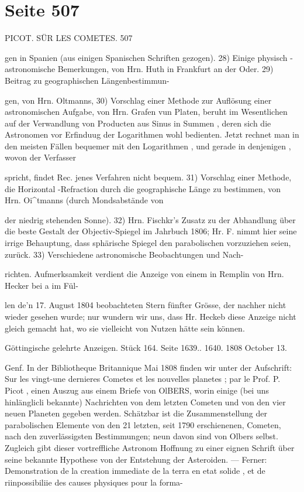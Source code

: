 \documentclass[10pt,a4paper]{article}
\begin{document}
\newpage
\section*{Seite 507}
PICOT. SÜR LES COMETES. 507

gen in Spanien (aus einigen Spanischen Schriften gezogen). 28) Einige physisch - astronomische Bemerkungen, von Hrn. Huth in Frankfurt an der Oder. 29) Beitrag zu geographischen Längenbestimmun-

gen, von Hrn. Oltmanns, 30) Vorschlag einer Methode zur Auflösung einer astronomischen Aufgabe, von Hrn. Grafen vun Platen, beruht im Wesentlichen auf der Verwandlung von Producten aus Sinus in Summen , deren sich die Astronomen vor Erfinduug der Logarithmen wohl bedienten. Jetzt rechnet man in den meisten Fällen bequemer mit den Logarithmen , und gerade in denjenigen , wovon der Verfasser

spricht, findet Rec. jenes Verfahren nicht bequem. 31) Vorschlag einer Methode, die Horizontal -Refraction durch die geographische Länge zu bestimmen, von Hrn. Oi\textasciicircum{}tmanns (durch Mondsabstände von

der niedrig stehenden Sonne). 32) Hrn. Fischkr's Zusatz zu der Abhandlung über die beste Gestalt der Objectiv-Spiegel im Jahrbuch 1806; Hr. F. nimmt hier seine irrige Behauptung, dass sphärische Spiegel den parabolischen vorzuziehen seien, zurück. 33) Verschiedene astronomische Beobachtungen und Nach-

richten. Aufmerksamkeit verdient die Anzeige von einem in Remplin von Hrn. Hecker bei a im Fül-

len de'n 17. August 1804 beobachteten Stern fünfter Grösse, der nachher nicht wieder gesehen wurde; nur wundern wir uns, dass Hr. Heckeb diese Anzeige nicht gleich gemacht hat, wo sie vielleicht von Nutzen hätte sein können.

Göttingische gelehrte Anzeigen. Stück 164. Seite 1639.. 1640. 1808 October 13.

Genf. In der Bibliotheque Britannique Mai 1808 finden wir unter der Aufschrift: Sur les vingt-une dernieres Cometes et les nouvelles planetes ; par le Prof. P. Picot , einen Auszug aus einem Briefe von OlBERS, worin einige (bei uns hinlänglicli bekannte) Nachrichten von dem letzten Cometen und von den vier neuen Planeten gegeben werden. Schätzbar ist die Zusammenstellung der parabolischen Elemente von den 21 letzten, seit 1790 erschienenen, Cometen, nach den zuverlässigsten Bestimmungen; neun davon sind von Olbers selbst. Zugleich gibt dieser vortreffliche Astronom Hoffnung zu einer eignen Schrift über seine bekannte Hypothese von der Entstehung der Asteroiden. — Ferner: Demonstration de la creation immediate de la terra en etat solide , et de riinpossibiliie des causes physiques pour la forma-
\end{document}
